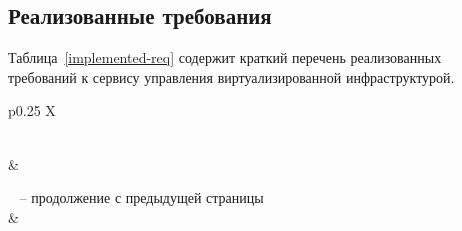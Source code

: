 \subsection{Реализованные требования}
Таблица~\ref{implemented-req} содержит краткий перечень реализованных требований к сервису управления виртуализированной инфраструктурой.
    
\begin{xltabular}{\textwidth}{p{0.25\textwidth} X}
    \caption{Перечень реализованных требований к сервису} \label{implemented-req} \\ 
     &  \\ \hline 
    \endfirsthead
    
    {\tablename\ \thetable{} -- продолжение с предыдущей страницы} \\
     &  \\ \hline 
    \endhead

    \hline {} \\ 
    \endfoot

    \hline
    \endlastfoot
    

\end{xltabular}
